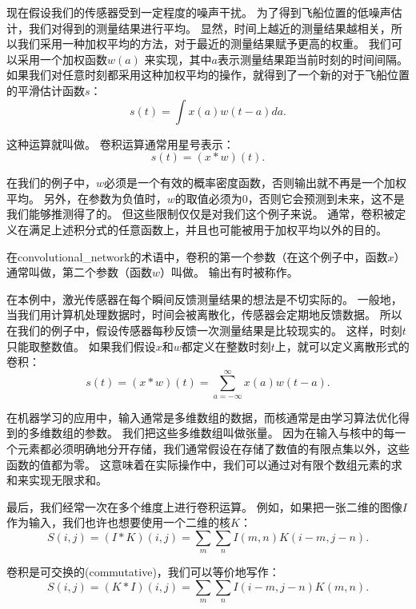 现在假设我们的传感器受到一定程度的噪声干扰。
为了得到飞船位置的低噪声估计，我们对得到的测量结果进行平均。
显然，时间上越近的测量结果越相关，所以我们采用一种加权平均的方法，对于最近的测量结果赋予更高的权重。
我们可以采用一个加权函数$w(a)$ 来实现，其中$a$表示测量结果距当前时刻的时间间隔。
如果我们对任意时刻都采用这种加权平均的操作，就得到了一个新的对于飞船位置的平滑估计函数$s$：
\begin{equation}
s(t) = \int x(a)w(t-a)da.
\end{equation}

这种运算就叫做。
卷积运算通常用星号表示：
\begin{equation}
s(t) = (x*w)(t).
\end{equation}

在我们的例子中，$w$必须是一个有效的概率密度函数，否则输出就不再是一个加权平均。
另外，在参数为负值时，$w$的取值必须为0，否则它会预测到未来，这不是我们能够推测得了的。
但这些限制仅仅是对我们这个例子来说。
通常，卷积被定义在满足上述积分式的任意函数上，并且也可能被用于加权平均以外的目的。

在\gls{convolutional_network}的术语中，卷积的第一个参数（在这个例子中，函数$x$）通常叫做，第二个参数（函数$w$）叫做。
输出有时被称作。

 
在本例中，激光传感器在每个瞬间反馈测量结果的想法是不切实际的。
一般地，当我们用计算机处理数据时，时间会被离散化，传感器会定期地反馈数据。
所以在我们的例子中，假设传感器每秒反馈一次测量结果是比较现实的。
这样，时刻$t$只能取整数值。
如果我们假设$x$和$w$都定义在整数时刻$t$上，就可以定义离散形式的卷积：
\begin{equation}
s(t) = (x*w)(t) = \sum_{a = -\infty}^{\infty} x(a)w(t-a).
\end{equation}

在机器学习的应用中，输入通常是多维数组的数据，而核通常是由学习算法优化得到的多维数组的参数。
我们把这些多维数组叫做张量。
因为在输入与核中的每一个元素都必须明确地分开存储，我们通常假设在存储了数值的有限点集以外，这些函数的值都为零。
这意味着在实际操作中，我们可以通过对有限个数组元素的求和来实现无限求和。

最后，我们经常一次在多个维度上进行卷积运算。
例如，如果把一张二维的图像$I$作为输入，我们也许也想要使用一个二维的核$K$：
\begin{equation}
S(i,j) = (I*K)(i,j) = \sum_m \sum_n I(m,n) K(i-m, j-n).
\end{equation}

卷积是可交换的(commutative)，我们可以等价地写作：
\begin{equation}
S(i, j) = (K*I)(i,j) = \sum_m \sum_n I(i-m, j-n) K(m, n).
\end{equation}

